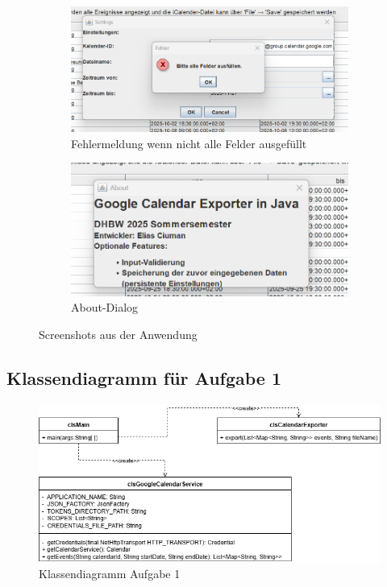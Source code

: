 \documentclass[a4paper]{article}
\begin{document}
\begin{figure}[H]
		\vspace{1em}
		
		
		\begin{subfigure}[t]{0.45\textwidth}
			\centering
			\includegraphics[width=\textwidth]{img/error_example.png}
			\caption{Fehlermeldung wenn nicht alle Felder ausgefüllt}
		\end{subfigure}
		
		\vspace{1em}
		
		
		\begin{subfigure}[t]{0.45\textwidth}
			\centering
			\includegraphics[width=\textwidth]{img/about_dialog.png}
			\caption{About-Dialog}
		\end{subfigure}	
		\caption{Screenshots aus der Anwendung}	
	\end{figure}
	
	\subsection*{Klassendiagramm für Aufgabe 1}
	
	\begin{figure}[H]
		\centering
		\includegraphics[width=\textwidth]{img/Klassendiagramm_Aufgabe1.png}
		\caption{Klassendiagramm Aufgabe 1}
	\end{figure}
	
\end{document}
